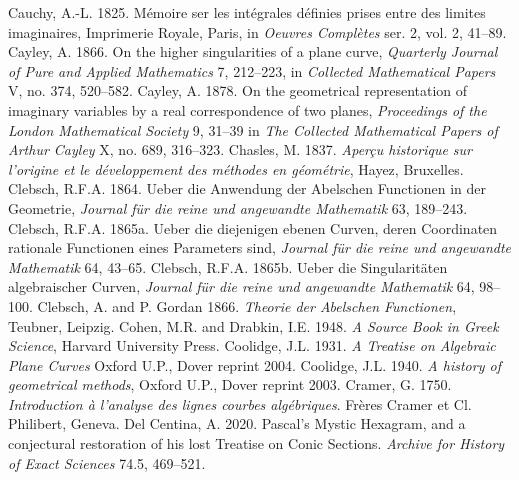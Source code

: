  \newline\indent  Cauchy, A.-L. 1825. M\'emoire ser les int\'egrales d\'efinies prises  entre des limites imaginaires, Imprimerie Royale, Paris, in \emph{Oeuvres Compl\`etes} ser. 2, vol. 2, 41--89. 
\newline\indent Cayley, A. 1866. On the higher singularities of a plane curve, \emph{Quarterly Journal of Pure and Applied Mathematics} 7, 212--223, in \emph{Collected Mathematical Papers} V, no. 374, 520--582.
\newline\indent   Cayley, A. 1878. On the geometrical representation of imaginary variables by a real correspondence of two planes, \emph{Proceedings of the  London Mathematical Society} 9, 31--39 in \emph{The Collected Mathematical Papers of Arthur Cayley} X, no. 689, 316--323.
\newline\indent Chasles, M. 1837.  \emph{Aper\c{c}u historique sur l'origine et le d\'eveloppement des m\'ethodes en g\'eom\'etrie}, Hayez, Bruxelles. 
\newline\indent Clebsch, R.F.A. 1864.  Ueber die Anwendung der Abelschen Functionen in der Geometrie, \emph{Journal f\"ur die reine und angewandte Mathematik}  63, 189--243.
\newline\indent Clebsch, R.F.A. 1865a. Ueber die diejenigen ebenen Curven, deren Coordinaten rationale Functionen eines Parameters sind, \emph{Journal f\"ur die reine und angewandte Mathematik} 64, 43--65.
\newline\indent Clebsch, R.F.A. 1865b. Ueber die Singularit\"aten algebraischer Curven, \emph{Journal f\"ur die reine und angewandte Mathematik} 64, 98--100.
\newline\indent Clebsch, A. and P. Gordan 1866. \emph{Theorie der Abelschen Functionen}, Teubner, Leipzig.
\newline\indent Cohen, M.R. and Drabkin, I.E. 1948. \emph{A Source Book in Greek Science}, Harvard University Press.
\newline\indent Coolidge, J.L.  1931. \emph{A Treatise on Algebraic Plane Curves} Oxford U.P., Dover reprint 2004.
\newline\indent Coolidge, J.L.  1940.  \emph{A history of geometrical methods}, Oxford U.P., Dover reprint 2003.
\newline\indent Cramer, G. 1750. \emph{Introduction \`a l'analyse des lignes courbes alg\'ebriques}. Fr\`eres Cramer et Cl. Philibert, Geneva.
\newline\indent Del Centina, A. 2020. Pascal's Mystic Hexagram, and a conjectural restoration of his lost Treatise on Conic Sections. \emph{Archive for History of Exact Sciences} 74.5, 469--521.
